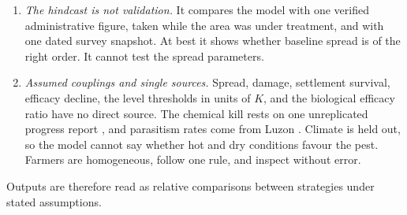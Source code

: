 \begin{enumerate}
	\item \emph{The hindcast is not validation.} It compares the model with one verified administrative figure, taken while the area was under treatment, and with one dated survey snapshot. At best it shows whether baseline spread is of the right order. It cannot test the spread parameters.
	\item \emph{Assumed couplings and single sources.} Spread, damage, settlement survival, efficacy decline, the level thresholds in units of $K$, and the biological efficacy ratio have no direct source. The chemical kill rests on one unreplicated progress report \citep{SRAnd}, and parasitism rates come from Luzon \citep{Guerrero2024}. Climate is held out, so the model cannot say whether hot and dry conditions favour the pest. Farmers are homogeneous, follow one rule, and inspect without error.
\end{enumerate}

Outputs are therefore read as relative comparisons between strategies under stated assumptions.
